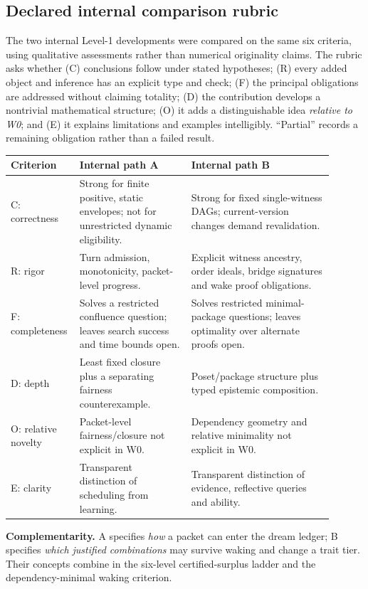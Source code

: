 \documentclass[11pt,letterpaper]{article}
\begin{document}
\subsection{Declared internal comparison rubric}
The two internal Level-1 developments were compared on the same six criteria, using qualitative assessments rather than numerical originality claims. The rubric asks whether (C) conclusions follow under stated hypotheses; (R) every added object and inference has an explicit type and check; (F) the principal obligations are addressed without claiming totality; (D) the contribution develops a nontrivial mathematical structure; (O) it adds a distinguishable idea \emph{relative to W0}; and (E) it explains limitations and examples intelligibly. ``Partial'' records a remaining obligation rather than a failed result.
\begin{center}\small
\begin{tabular}{@{}>{\raggedright\arraybackslash}p{0.15\linewidth}>{\raggedright\arraybackslash}p{0.33\linewidth}>{\raggedright\arraybackslash}p{0.42\linewidth}@{}}
\toprule Criterion & Internal path A & Internal path B \\\midrule
C: correctness & Strong for finite positive, static envelopes; not for unrestricted dynamic eligibility. & Strong for fixed single-witness DAGs; current-version changes demand revalidation.\\
R: rigor & Turn admission, monotonicity, packet-level progress. & Explicit witness ancestry, order ideals, bridge signatures and wake proof obligations.\\
F: completeness & Solves a restricted confluence question; leaves search success and time bounds open. & Solves restricted minimal-package questions; leaves optimality over alternate proofs open.\\
D: depth & Least fixed closure plus a separating fairness counterexample. & Poset/package structure plus typed epistemic composition.\\
O: relative novelty & Packet-level fairness/closure not explicit in W0. & Dependency geometry and relative minimality not explicit in W0.\\
E: clarity & Transparent distinction of scheduling from learning. & Transparent distinction of evidence, reflective queries and ability.\\\bottomrule
\end{tabular}\end{center}
\noindent\textbf{Complementarity.} A specifies \emph{how} a packet can enter the dream ledger; B specifies \emph{which justified combinations} may survive waking and change a trait tier. Their concepts combine in the six-level certified-surplus ladder and the dependency-minimal waking criterion.\\
\end{document}
